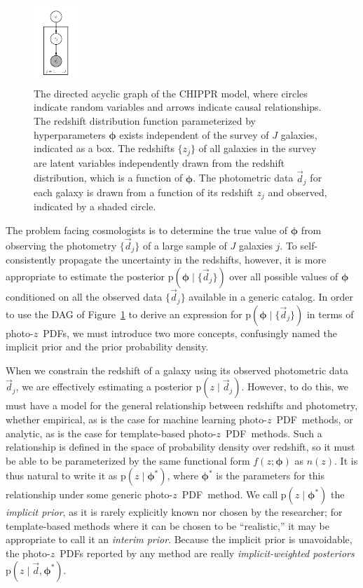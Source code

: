 \documentclass[iop]{emulateapj}
\newcommand{\Fig}[1]{Figure~\ref{#1}}
\newcommand{\nz}{$n(z)$}
\newcommand{\data}{\ensuremath{\vec{d}}}
\newcommand{\pr}[1]{\ensuremath{\mathrm{p}(#1)}}
\newcommand{\gvn}{\mid}%
\newcommand{\pz}{photo-$z$~}
\newcommand{\pzpdf}{\pz PDF}
\newcommand{\bvec}[1]{\ensuremath{\boldsymbol{#1}}}
\newcommand{\ndphi}{\bvec{\phi}}
\begin{document}
\begin{figure}
	\begin{center}
		\includegraphics[width=0.15\textwidth]{figures/chippr/pgm.png}
		\caption{The directed acyclic graph of the CHIPPR model, where circles indicate random variables and arrows indicate causal relationships.
			The redshift distribution function parameterized by hyperparameters $\ndphi$ exists independent of the survey of $J$ galaxies, indicated as a box.  
			The redshifts $\{z_{j}\}$ of all galaxies in the survey are latent variables independently drawn from the redshift distribution, which is a function of $\ndphi$. 
			The photometric data $\data_{j}$ for each galaxy is drawn from a function of its redshift $z_{j}$ and observed, indicated by a shaded circle.}
		\label{fig:pgm}
	\end{center}
\end{figure}

The problem facing cosmologists is to determine the true value of $\ndphi$ from observing the photometry $\{\data_{j}\}$ of a large sample of $J$ galaxies $j$.
To self-consistently propagate the uncertainty in the redshifts, however, it is more appropriate to estimate the posterior $\pr{\ndphi \gvn \{\data_{j}\}}$ over all possible values of $\ndphi$ conditioned on all the observed data $\{\data_{j}\}$ available in a generic catalog.
In order to use the DAG of \Fig{fig:pgm} to derive an expression for $\pr{\ndphi \gvn \{\data_{j}\}}$ in terms of \pzpdf s, we must introduce two more concepts, confusingly named the implicit prior and the prior probability density.

When we constrain the redshift of a galaxy using its observed photometric data $\data_{j}$, we are effectively estimating a posterior $\pr{z \gvn \data_{j}}$.
However, to do this, we must have a model for the general relationship between redshifts and photometry, whether empirical, as is the case for machine learning \pzpdf\ methods, or analytic, as is the case for template-based \pzpdf\ methods.
Such a relationship is defined in the space of probability density over redshift, so it must be able to be parameterized by the same functional form $f(z; \ndphi)$ as \nz .
It is thus natural to write it as $\pr{z \gvn \ndphi^{*}}$, where $\ndphi^{*}$ is the parameters for this relationship under some generic \pzpdf\ method.
We call $\pr{z \gvn \ndphi^{*}}$ the \textit{implicit prior}, as it is rarely explicitly known nor chosen by the researcher; for template-based methods where it can be chosen to be ``realistic,'' it may be appropriate to call it an \textit{interim prior}.
Because the implicit prior is unavoidable, the \pzpdf s reported by any method are really \textit{implicit-weighted posteriors} $\pr{z \gvn \data, \ndphi^{*}}$.
\end{document}
